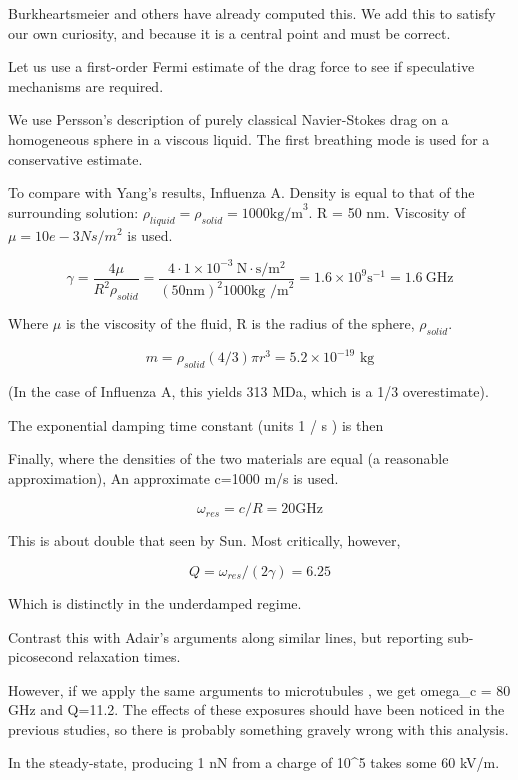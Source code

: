 \documentclass[paper.tex]{subfiles}
\begin{document}
\begin{autem}
	Burkheartsmeier and others have already computed this. We add this to satisfy our own curiosity, and because it is a central point and must be correct.
\end{autem}


Let us use a first-order Fermi estimate of the drag force to see if speculative mechanisms are required.

We use Persson's description of purely classical Navier-Stokes drag \cite{nature1986} on a homogeneous sphere in a viscous liquid. The first breathing mode is used for a conservative estimate.

To compare with Yang's results, Influenza A. Density is equal to that of the surrounding solution: $\rho_{liquid} = \rho_{solid} = 1000 \text{kg/m}^3$. R = 50 nm. Viscosity of $\mu=10e-3 Ns/m^2$ is used.

$$ \gamma = \frac{4\mu}{R^2 \rho_{solid}} = \frac{4 \cdot 1\times 10^{-3}\  \text{N}\cdot \text{s} / \text{m}^2 }{(50 \text{nm})^2 1000 \text{kg /m}^2} = 1.6 \times 10^9 \text{s}^{-1} = 1.6\ \text{GHz}$$

Where $\mu$ is the viscosity of the fluid, R is the radius of the sphere, $\rho_{solid}$. \footnotemark \footnotemark



$$m = \rho_{solid}  (4/3) \pi r^3 = 5.2 \times 10^{-19} \text{ kg} $$

(In the case of Influenza A, this yields 313 MDa, which is a 1/3 overestimate). 

The exponential damping time constant (units 1 / s ) is then

Finally, where the densities of the two materials are equal (a reasonable approximation), An approximate c=1000 m/s is used. 

$$ \omega_{res} = c / R = 20 \text{GHz}$$

This is about double that seen by Sun. Most critically, however,

$$ Q = \omega_{res}/(2\gamma) = 6.25 $$

Which is distinctly in the underdamped regime.

Contrast this with Adair's arguments along similar lines, but reporting sub-picosecond relaxation times.

However, if we apply the same arguments to microtubules \cite{Viscous2000}, we get omega_c = 80 GHz and Q=11.2. The effects of these exposures should have been noticed in the previous studies, so there is probably something gravely wrong with this analysis.






In the steady-state, producing 1 nN from a charge of 10^5 takes some 60 kV/m. 
\end{document}
